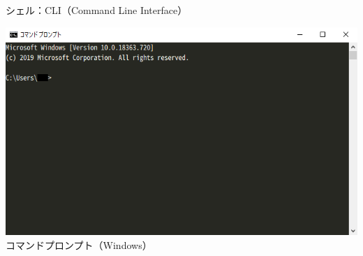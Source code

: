 \documentclass[12pt,aspectratio=169]{beamer}
\begin{document}
\begin{frame}{シェル：CLI（Command Line Interface）}

  \begin{minipage}{0.3\textwidth}
    \includegraphics[width=1.2\linewidth,bb=0 0 698 412]{./images/cmd.png}
    コマンドプロンプト（Windows）


\end{minipage}
\end{frame}
\end{document}
